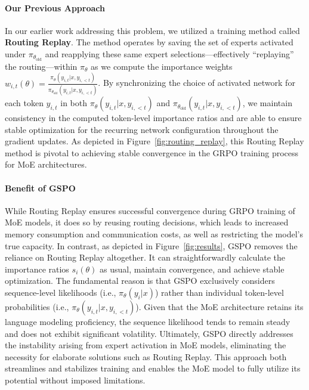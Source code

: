 \paragraph{Our Previous Approach} In our earlier work addressing this problem, we utilized a training method called \textbf{Routing Replay}. The method operates by saving the set of experts activated under $\pi_{\theta_\text{old}}$ and reapplying these same expert selections—effectively ``replaying'' the routing—within $\pi_{\theta}$ as we compute the importance weights $w_{i,t}(\theta) = \frac{ \pi_{\theta} (y_{i,t} | x, y_{i,<t}) }{ \pi_{\theta_\text{old}} (y_{i,t} | x,y_{i,<t})}$. By synchronizing the choice of activated network for each token $y_{i,t}$ in both $\pi_{\theta} (y_{i,t} | x, y_{i,<t})$ and $\pi_{\theta_\text{old}} (y_{i,t} | x,y_{i,<t})$, we maintain consistency in the computed token-level importance ratios and are able to ensure stable optimization for the recurring network configuration throughout the gradient updates. As depicted in Figure~\ref{fig:routing_replay}, this Routing Replay method is pivotal to achieving stable convergence in the GRPO training process for MoE architectures.

\paragraph{Benefit of GSPO} While Routing Replay ensures successful convergence during GRPO training of MoE models, it does so by reusing routing decisions, which leads to increased memory consumption and communication costs, as well as restricting the model’s true capacity. In contrast, as depicted in Figure~\ref{fig:results}, GSPO removes the reliance on Routing Replay altogether. It can straightforwardly calculate the importance ratios $s_i(\theta)$ as usual, maintain convergence, and achieve stable optimization. The fundamental reason is that GSPO exclusively considers sequence-level likelihoods (i.e., $\pi_{\theta} (y_i | x)$) rather than individual token-level probabilities (i.e., $\pi_{\theta} (y_{i,t} | x, y_{i,<t})$). Given that the MoE architecture retains its language modeling proficiency, the sequence likelihood tends to remain steady and does not exhibit significant volatility. Ultimately, GSPO directly addresses the instability arising from expert activation in MoE models, eliminating the necessity for elaborate solutions such as Routing Replay. This approach both streamlines and stabilizes training and enables the MoE model to fully utilize its potential without imposed limitations.

